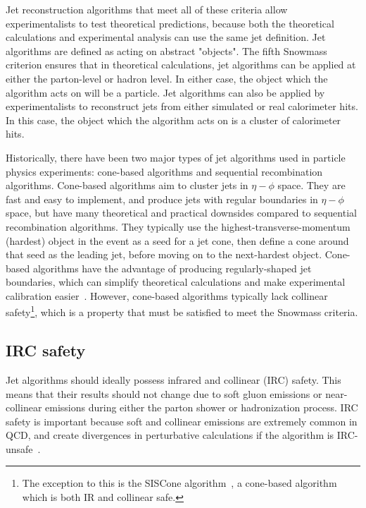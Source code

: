 Jet reconstruction algorithms that meet all of these criteria allow experimentalists to test theoretical predictions, because both the theoretical calculations and experimental analysis can use the same jet definition.
Jet algorithms are defined as acting on abstract "objects".
The fifth Snowmass criterion ensures that in theoretical calculations, jet algorithms can be applied at either the parton-level or hadron level.
In either case, the object which the algorithm acts on will be a particle.
Jet algorithms can also be applied by experimentalists to reconstruct jets from either simulated or real calorimeter hits.
In this case, the object which the algorithm acts on is a cluster of calorimeter hits.

Historically, there have been two major types of jet algorithms used in particle physics experiments: cone-based algorithms and sequential recombination algorithms.
Cone-based algorithms aim to cluster jets in $\eta-\phi$ space.
They are fast and easy to implement, and produce jets with regular boundaries in $\eta-\phi$ space, but have many theoretical and practical downsides compared to sequential recombination algorithms.
They typically use the highest-transverse-momentum (hardest) object in the event as a seed for a jet cone, then define a cone around that seed as the leading jet, before moving on to the next-hardest object.
Cone-based algorithms have the advantage of producing regularly-shaped jet boundaries, which can simplify theoretical calculations and make experimental calibration easier~\cite{jet-cone-algo}.
However, cone-based algorithms typically lack collinear safety\footnote{The exception to this is the SISCone algorithm~\cite{jet-siscone-algorithm}, a cone-based algorithm which is both IR and collinear safe.}, which is a property that must be satisfied to meet the Snowmass criteria.

\subsection{IRC safety}\label{subsec:jet_irc_safety}

Jet algorithms should ideally possess infrared and collinear (IRC) safety.
This means that their results should not change due to soft gluon emissions or near-collinear emissions during either the parton shower or hadronization process.
IRC safety is important because soft and collinear emissions are extremely common in QCD, and create divergences in perturbative calculations if the algorithm is IRC-unsafe~\cite{jet-jetography}.

